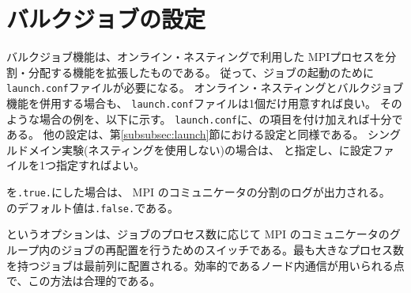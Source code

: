 \section{バルクジョブの設定}
バルクジョブ機能は、オンライン・ネスティングで利用した
MPIプロセスを分割・分配する機能を拡張したものである。
従って、ジョブの起動のために\verb|launch.conf|ファイルが必要になる。
オンライン・ネスティングとバルクジョブ機能を併用する場合も、
\verb|launch.conf|ファイルは1個だけ用意すれば良い。
そのような場合の例を、以下に示す。
\verb|launch.conf|に、の項目を付け加えれば十分である。
他の設定は、第\ref{subsubsec:launch}節における設定と同様である。
シングルドメイン実験(ネスティングを使用しない)の場合は、
と指定し、に設定ファイルを1つ指定すればよい。

を\verb|.true.|にした場合は、
MPI のコミュニケータの分割のログが出力される。
のデフォルト値は\verb|.false.|である。

というオプションは、ジョブのプロセス数に応じて MPI のコミュニケータのグループ内のジョブの再配置を行うためのスイッチである。最も大きなプロセス数を持つジョブは最前列に配置される。効率的であるノード内通信が用いられる点で、この方法は合理的である。


